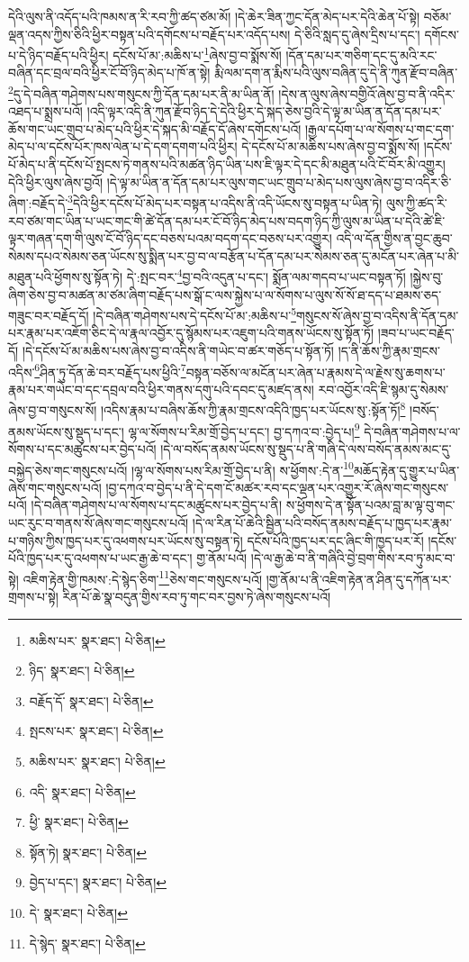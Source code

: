 དེའི་ལུས་ནི་འདོད་པའི་ཁམས་ན་རི་རབ་ཀྱི་ཚད་ཙམ་མོ། །དེ་ཆེར་ཟིན་ཀྱང་དོན་མེད་པར་དེའི་ཆེན་པོ་སྟེ། བཅོམ་ལྡན་འདས་ཀྱིས་ཅིའི་ཕྱིར་བསྟན་པའི་དགོངས་པ་བརྗོད་པར་འདོད་པས། དེ་ཅིའི་སླད་དུ་ཞེས་དྲིས་པ་དང་། དགོངས་པ་དེ་ཉིད་བརྗོད་པའི་ཕྱིར། དངོས་པོ་མ་:མཆིས་པ་\footnote{མཆིས་པར་  སྣར་ཐང་།  པེ་ཅིན། }ཞེས་བྱ་བ་སྨོས་སོ། །དོན་དམ་པར་གཅིག་དང་དུ་མའི་རང་བཞིན་དང་བྲལ་བའི་ཕྱིར་ངོ་བོ་ཉིད་མེད་པ་ཁོ་ན་སྟེ། རྨི་ལམ་དག་ན་རྨིས་པའི་ལུས་བཞིན་དུ་དེ་ནི་ཀུན་རྫོབ་བཞིན་\footnote{ཉིད་  སྣར་ཐང་།  པེ་ཅིན། }དུ་དེ་བཞིན་གཤེགས་པས་གསུངས་ཀྱི་དོན་དམ་པར་ནི་མ་ཡིན་ནོ། །དེས་ན་ལུས་ཞེས་བགྱིའོ་ཞེས་བྱ་བ་ནི་འདིར་འཐད་པ་སྨྲས་པའོ། །འདི་ལྟར་འདི་ནི་ཀུན་རྫོབ་ཉིད་དེ་དེའི་ཕྱིར་དེ་སྐད་ཅེས་བྱའི་དེ་ལྟ་མ་ཡིན་ན་དོན་དམ་པར་ཆོས་གང་ཡང་གྲུབ་པ་མེད་པའི་ཕྱིར་དེ་སྐད་མི་བརྗོད་དོ་ཞེས་དགོངས་པའོ། །རྒྱལ་དཔོག་པ་ལ་སོགས་པ་གང་དག་མེད་པ་ལ་དངོས་པོར་ཁས་ལེན་པ་དེ་དག་དགག་པའི་ཕྱིར། དེ་དངོས་པོ་མ་མཆིས་པས་ཞེས་བྱ་བ་སྨོས་སོ། །དངོས་པོ་མེད་པ་ནི་དངོས་པོ་སྤངས་ཏེ་གནས་པའི་མཚན་ཉིད་ཡིན་པས་ཇི་ལྟར་དེ་དང་མི་མཐུན་པའི་ངོ་བོར་མི་འགྱུར། དེའི་ཕྱིར་ལུས་ཞེས་བྱའོ། །དེ་ལྟ་མ་ཡིན་ན་དོན་དམ་པར་ལུས་གང་ཡང་གྲུབ་པ་མེད་པས་ལུས་ཞེས་བྱ་བ་འདིར་ཅི་ཞིག་:བརྗོད་དེ་\footnote{བརྗོད་དོ་  སྣར་ཐང་།  པེ་ཅིན། }དེའི་ཕྱིར་དངོས་པོ་མེད་པར་བསྟན་པ་འདིས་ནི་འདི་ཡོངས་སུ་བསྟན་པ་ཡིན་ཏེ། ལུས་ཀྱི་ཚད་རི་རབ་ཙམ་གང་ཡིན་པ་ཡང་གང་གི་ཚེ་དོན་དམ་པར་ངོ་བོ་ཉིད་མེད་པས་བདག་ཉིད་ཀྱི་ལུས་མ་ཡིན་པ་དེའི་ཚེ་ཇི་ལྟར་གཞན་དག་གི་ལུས་ངོ་བོ་ཉིད་དང་བཅས་པའམ་བདག་དང་བཅས་པར་འགྱུར། འདི་ལ་དོན་གྱིས་ན་བྱང་ཆུབ་སེམས་དཔའ་སེམས་ཅན་ཡོངས་སུ་སྨིན་པར་བྱ་བ་ལ་བརྩོན་པ་དོན་དམ་པར་སེམས་ཅན་དུ་མངོན་པར་ཞེན་པ་མི་མཐུན་པའི་ཕྱོགས་སུ་སྟོན་ཏེ། དེ་:སྤང་བར་\footnote{སྤངས་པར་  སྣར་ཐང་།  པེ་ཅིན། }བྱ་བའི་འདུན་པ་དང་། སྨོན་ལམ་གདབ་པ་ཡང་བསྟན་ཏོ། །སྐྱེས་བུ་ཞིག་ཅེས་བྱ་བ་མཚན་མ་ཙམ་ཞིག་བརྗོད་པས་སྒོ་ང་ལས་སྐྱེས་པ་ལ་སོགས་པ་ལུས་སོ་སོ་ཐ་དད་པ་ཐམས་ཅད་གཟུང་བར་བརྗོད་དོ། །དེ་བཞིན་གཤེགས་པས་དེ་དངོས་པོ་མ་:མཆིས་པ་\footnote{མཆིས་པར་  སྣར་ཐང་།  པེ་ཅིན། }གསུངས་སོ་ཞེས་བྱ་བ་འདིས་ནི་དོན་དམ་པར་རྣམ་པར་འཇོག་ཅིང་དེ་ལ་རྣལ་འབྱོར་དུ་སྙོམས་པར་འཇུག་པའི་གནས་ཡོངས་སུ་སྟོན་ཏོ། །ཟབ་པ་ཡང་བརྗོད་དོ། །དེ་དངོས་པོ་མ་མཆིས་པས་ཞེས་བྱ་བ་འདིས་ནི་གཡེང་བ་ཚར་གཅོད་པ་སྟོན་ཏོ། །ད་ནི་ཆོས་ཀྱི་རྣམ་གྲངས་འདིས་\footnote{འདི་  སྣར་ཐང་།  པེ་ཅིན། }ཤིན་ཏུ་དོན་ཆེ་བར་བརྗོད་པས་ཕྱིའི་\footnote{ཕྱི་  སྣར་ཐང་།  པེ་ཅིན། }བསྟན་བཅོས་ལ་མངོན་པར་ཞེན་པ་རྣམས་དེ་ལ་རྗེས་སུ་ཆགས་པ་རྣམ་པར་གཡེང་བ་དང་དབྲལ་བའི་ཕྱིར་གནས་དགུ་པའི་དབང་དུ་མཛད་ནས། རབ་འབྱོར་འདི་ཇི་སྙམ་དུ་སེམས་ཞེས་བྱ་བ་གསུངས་སོ། །འདིས་རྣམ་པ་བཞིས་ཆོས་ཀྱི་རྣམ་གྲངས་འདིའི་ཁྱད་པར་ཡོངས་སུ་:སྟོན་ཏོ།\footnote{སྟོན་ཏེ།  སྣར་ཐང་།  པེ་ཅིན། } །བསོད་ནམས་ཡོངས་སུ་སྡུད་པ་དང་། ལྷ་ལ་སོགས་པ་རིམ་གྲོ་བྱེད་པ་དང་། བྱ་དཀའ་བ་:བྱེད་པ།\footnote{བྱེད་པ་དང་།  སྣར་ཐང་།  པེ་ཅིན། } དེ་བཞིན་གཤེགས་པ་ལ་སོགས་པ་དང་མཚུངས་པར་བྱེད་པའོ། །དེ་ལ་བསོད་ནམས་ཡོངས་སུ་སྡུད་པ་ནི་གཞི་དེ་ལས་བསོད་ནམས་མང་དུ་བསྐྱེད་ཅེས་གང་གསུངས་པའོ། །ལྷ་ལ་སོགས་པས་རིམ་གྲོ་བྱེད་པ་ནི། ས་ཕྱོགས་:དེ་ན་\footnote{དེ་  སྣར་ཐང་།  པེ་ཅིན། }མཆོད་རྟེན་དུ་གྱུར་པ་ཡིན་ཞེས་གང་གསུངས་པའོ། །བྱ་དཀའ་བ་བྱེད་པ་ནི་དེ་དག་ངོ་མཚར་རབ་དང་ལྡན་པར་འགྱུར་རོ་ཞེས་གང་གསུངས་པའོ། །དེ་བཞིན་གཤེགས་པ་ལ་སོགས་པ་དང་མཚུངས་པར་བྱེད་པ་ནི། ས་ཕྱོགས་དེ་ན་སྟོན་པའམ་བླ་མ་ལྟ་བུ་གང་ཡང་རུང་བ་གནས་སོ་ཞེས་གང་གསུངས་པའོ། །དེ་ལ་རིན་པོ་ཆེའི་སྦྱིན་པའི་བསོད་ནམས་བརྗོད་པ་ཁྱད་པར་རྣམ་པ་གཉིས་ཀྱིས་ཁྱད་པར་དུ་འཕགས་པར་ཡོངས་སུ་བསྟན་ཏེ། དངོས་པོའི་ཁྱད་པར་དང་ཞིང་གི་ཁྱད་པར་རོ། །དངོས་པོའི་ཁྱད་པར་དུ་འཕགས་པ་ཡང་རྒྱ་ཆེ་བ་དང་། གྱ་ནོམ་པའོ། །དེ་ལ་རྒྱ་ཆེ་བ་ནི་གཞིའི་བྱེ་བྲག་གིས་རབ་ཏུ་མང་བ་སྟེ། འཇིག་རྟེན་གྱི་ཁམས་:དེ་སྙེད་ཅིག་\footnote{དེ་སྙེད་  སྣར་ཐང་།  པེ་ཅིན། }ཅེས་གང་གསུངས་པའོ། །གྱ་ནོམ་པ་ནི་འཇིག་རྟེན་ན་ཤིན་དུ་དཀོན་པར་གྲགས་པ་སྟེ། རིན་པོ་ཆེ་སྣ་བདུན་གྱིས་རབ་ཏུ་གང་བར་བྱས་ཏེ་ཞེས་གསུངས་པའོ། 